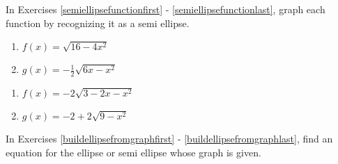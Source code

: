 \documentclass{ximera}
\begin{document}
In Exercises \ref{semiellipsefunctionfirst} - \ref{semiellipsefunctionlast}, graph each function by recognizing it as a semi ellipse.

\begin{multicols}{2}
\begin{enumerate}
\setcounter{enumi}{\value{HW}}

\item   $f(x) = \sqrt{16-4x^2}$ \label{semiellipsefunctionfirst}
\item   $g(x) = -\frac{1}{2} \sqrt{6x-x^2}$

\setcounter{HW}{\value{enumi}}
\end{enumerate}
\end{multicols}

\begin{multicols}{2}
\begin{enumerate}
\setcounter{enumi}{\value{HW}}

\item  $f(x) = -2\sqrt{3-2x-x^2}$
\item  $g(x) = -2 + 2\sqrt{9-x^2}$ \label{semiellipsefunctionlast}

\setcounter{HW}{\value{enumi}}
\end{enumerate}
\end{multicols}

\pagebreak

In Exercises \ref{buildellipsefromgraphfirst} - \ref{buildellipsefromgraphlast}, find an equation for the ellipse or semi ellipse whose graph is given.
\end{document}
